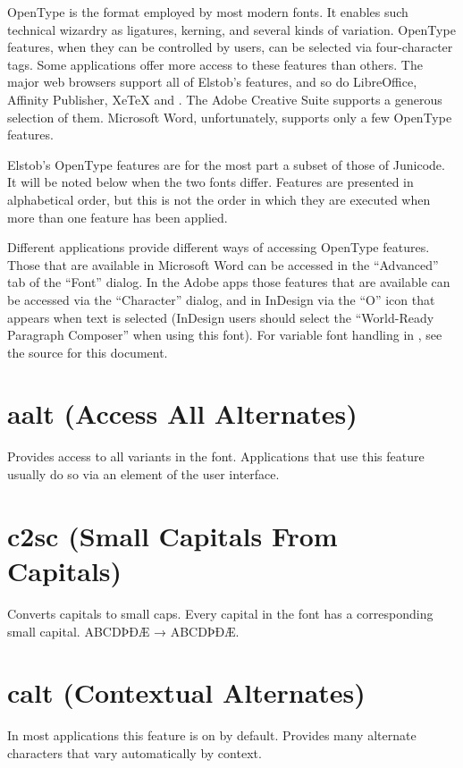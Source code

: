 \documentclass[12pt,letterpaper,openany]{book}
\begin{document}
OpenType is the format employed by most modern fonts. It enables such technical
wizardry as ligatures, kerning, and several kinds of variation. OpenType features,
when they can be controlled by users, can be selected via four-character tags.
Some applications offer more access to these features than others. The major web browsers
support all of Elstob’s features, and so do LibreOffice, Affinity Publisher,
XeTeX and {\ltech}. The Adobe Creative Suite supports a generous selection of
them. Microsoft Word, unfortunately, supports only a few OpenType features.

Elstob’s OpenType
features are for the most part a subset of those of Junicode. It will be noted
below when the two fonts differ. Features are presented in alphabetical order,
but this is not the order in which they are executed when more than one feature
has been applied.

Different applications provide different ways of accessing OpenType features.
Those that are available in Microsoft Word can be accessed in the “Advanced”
tab of the “Font” dialog. In the Adobe apps those features that are available
can be accessed via the “Character” dialog, and in InDesign via the “O” icon that
appears when text is selected (InDesign users should select the “World-Ready
Paragraph Composer” when using this font). For variable font handling in
{\ltech}, see the source for this document.

\section{aalt (Access All Alternates)}
Provides access to all variants in the font. Applications that use this feature
usually do so via an element of the user interface.

\section{c2sc (Small Capitals From Capitals)}
Converts capitals to small caps. Every capital in the font has a corresponding
small capital. ABCDÞÐÆ → { ABCDÞÐÆ}.

\section{calt (Contextual Alternates)}
In most applications this feature is on by default.
Provides many alternate characters that vary automatically by context.
\end{document}
